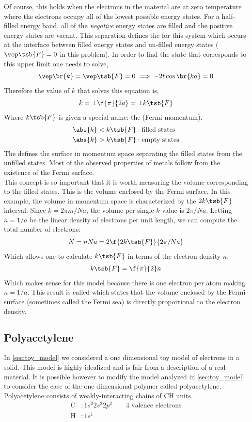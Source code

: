 \documentclass{article}
\begin{document}
Of course, this holds when the electrons in the material are at zero temperature where the electrons occupy all of the lowest possible energy states. For a half-filled energy band, all of the \textit{negative} energy states are filled and the positive energy states are vacant. This separation defines the  for this system which occurs at the interface between filled energy states and un-filled energy states ($\vep\tsb{F} = 0$ in this problem). In order to find the state that corresponds to this upper limit one needs to solve,
\[ \vep\br{k} = \vep\tsb{F} = 0 \implies -2t \cos\br{ka} = 0 \]
Therefore the value of $k$ that solves this equation is,
\[  k = \pm \f{\pi}{2a} = \pm k\tsb{F}\]
Where $k\tsb{F}$ is given a special name: the  (Fermi momentum).
\begin{align*}
    \abs{k} < k\tsb{F} &: \text{filled states}\\
    \abs{k} > k\tsb{F} &: \text{empty states}
\end{align*}
The  defines the surface in momentum space separating the filled states from the unfilled states. Most of the observed properties of metals follow from the existence of the Fermi surface. \\

This concept is so important that it is worth measuring the volume  corresponding to the filled states. This is the volume enclosed by the Fermi surface. In this example, the volume in momentum space is characterized by the $2 k\tsb{F}$ interval. Since $k = 2\pi m / Na$, the volume per single $k$-value is $2 \pi / Na$. Letting $n = 1/a$ be the linear density of electrons per unit length, we can compute the total number of electrons:
\[ N =  n N a = 2 \f{2k\tsb{F}}{2 \pi / Na} \]
Which allows one to calculate $k\tsb{F}$ in terms of the electron density $n$,
\[ k\tsb{F} =\f{\pi}{2} n \]
Which makes sense for this model because there is one electron per atom making $n = 1/a$.
This result is called  which states that the volume enclosed by the Fermi surface (sometimes called the Fermi sea) is directly proportional to the electron density. \\

\subsection{Polyacetylene}

In \cref{sec:toy_model} we considered a one dimensional toy model of electrons in a solid. This model is highly idealized and is fair from a description of a real material. It is possible however to modify the model analyzed in \cref{sec:toy_model} to consider the case of the one dimensional polymer called polyacetylene. Polyacetylene consists of weakly-interacting chains of CH units.
\begin{align*}
    \text{C} &: 1s^2 2s^2 2p^2 \qquad \text{4 valence electrons}\\
    \text{H} &: 1s^1
\end{align*}
\end{document}
